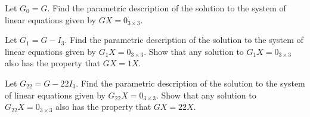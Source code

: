 \documentclass{ximera}
\begin{document}
\begin{question}
\begin{problem}
Let $G_0 = G$.  Find the parametric description of the solution to the system of linear equations given by $GX = 0_{3 \times 3}$.
\end{problem}  

\begin{problem}
Let $G_1 = G - I_3$.  Find the parametric description of the solution to the system of linear equations given by $G_1X = 0_{3 \times 3}$.  Show that any solution to $G_1X = 0_{3 \times 3}$ also has the property that $GX = 1X$.
\end{problem}

\begin{problem}\label{eigenlast}
Let $G_{22} = G - 22 I_3$.  Find the parametric description of the solution to the system of linear equations given by $G_{22}X = 0_{3 \times 3}$.  Show that any solution to $G_{22}X = 0_{3 \times 3}$ also has the property that $GX = 22X$. 
\end{problem}

\end{question}
\end{document}

